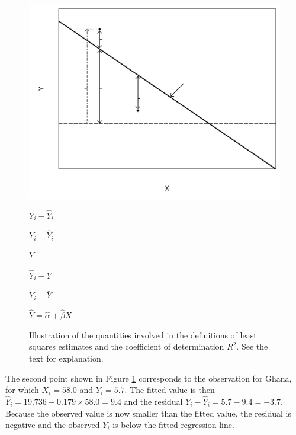 \begin{figure}
\caption{Illustration of the quantities involved in the definitions of
least squares estimates and the coefficient of determination $R^{2}$.
See the text for explanation.}
\label{f_residuals}
\begin{center}
\includegraphics[width=13.5cm]{lmresids}
\end{center}
$Y_{i}-\hat{Y}_{i}$

$Y_{i}-\hat{Y}_{i}$

$\bar{Y}$

$\hat{Y}_{i}-\bar{Y}$

$Y_{i}-\bar{Y}$

$\hat{Y}=\hat{\alpha}+\hat{\beta} X$
\end{figure}

The second point shown in Figure \ref{f_residuals} corresponds to the
observation for Ghana, for which $X_{i}=58.0$ and $Y_{i}=5.7$. The
fitted value is then $\hat{Y}_{i}=19.736-0.179\times 58.0=9.4$ and the
residual $Y_{i}-\hat{Y}_{i}=5.7-9.4=-3.7$. Because the observed value is
now smaller than the fitted value, the residual is negative and the
observed $Y_{i}$ is below the fitted regression line.

